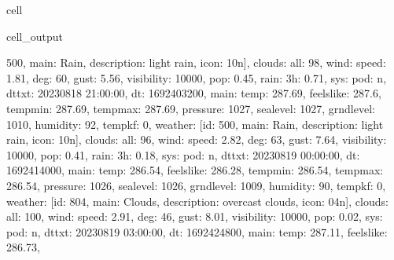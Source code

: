 \documentclass[letterpaper,10pt,english]{jupyterBook}
\begin{document}
\begin{sphinxuseclass}{cell}
\begin{sphinxVerbatimOutput}
\begin{sphinxuseclass}{cell_output}
\begin{sphinxVerbatim}[commandchars=\\\{\}]
500, \PYGZsq{}main\PYGZsq{}: \PYGZsq{}Rain\PYGZsq{}, \PYGZsq{}description\PYGZsq{}: \PYGZsq{}light rain\PYGZsq{}, \PYGZsq{}icon\PYGZsq{}: \PYGZsq{}10n\PYGZsq{}\PYGZcb{}], \PYGZsq{}clouds\PYGZsq{}: \PYGZob{}\PYGZsq{}all\PYGZsq{}: 98\PYGZcb{}, \PYGZsq{}wind\PYGZsq{}: \PYGZob{}\PYGZsq{}speed\PYGZsq{}: 1.81, \PYGZsq{}deg\PYGZsq{}: 60, \PYGZsq{}gust\PYGZsq{}: 5.56\PYGZcb{}, \PYGZsq{}visibility\PYGZsq{}: 10000, \PYGZsq{}pop\PYGZsq{}: 0.45, \PYGZsq{}rain\PYGZsq{}: \PYGZob{}\PYGZsq{}3h\PYGZsq{}: 0.71\PYGZcb{}, \PYGZsq{}sys\PYGZsq{}: \PYGZob{}\PYGZsq{}pod\PYGZsq{}: \PYGZsq{}n\PYGZsq{}\PYGZcb{}, \PYGZsq{}dt\PYGZus{}txt\PYGZsq{}: \PYGZsq{}2023\PYGZhy{}08\PYGZhy{}18 21:00:00\PYGZsq{}\PYGZcb{}, \PYGZob{}\PYGZsq{}dt\PYGZsq{}: 1692403200, \PYGZsq{}main\PYGZsq{}: \PYGZob{}\PYGZsq{}temp\PYGZsq{}: 287.69, \PYGZsq{}feels\PYGZus{}like\PYGZsq{}: 287.6, \PYGZsq{}temp\PYGZus{}min\PYGZsq{}: 287.69, \PYGZsq{}temp\PYGZus{}max\PYGZsq{}: 287.69, \PYGZsq{}pressure\PYGZsq{}: 1027, \PYGZsq{}sea\PYGZus{}level\PYGZsq{}: 1027, \PYGZsq{}grnd\PYGZus{}level\PYGZsq{}: 1010, \PYGZsq{}humidity\PYGZsq{}: 92, \PYGZsq{}temp\PYGZus{}kf\PYGZsq{}: 0\PYGZcb{}, \PYGZsq{}weather\PYGZsq{}: [\PYGZob{}\PYGZsq{}id\PYGZsq{}: 500, \PYGZsq{}main\PYGZsq{}: \PYGZsq{}Rain\PYGZsq{}, \PYGZsq{}description\PYGZsq{}: \PYGZsq{}light rain\PYGZsq{}, \PYGZsq{}icon\PYGZsq{}: \PYGZsq{}10n\PYGZsq{}\PYGZcb{}], \PYGZsq{}clouds\PYGZsq{}: \PYGZob{}\PYGZsq{}all\PYGZsq{}: 96\PYGZcb{}, \PYGZsq{}wind\PYGZsq{}: \PYGZob{}\PYGZsq{}speed\PYGZsq{}: 2.82, \PYGZsq{}deg\PYGZsq{}: 63, \PYGZsq{}gust\PYGZsq{}: 7.64\PYGZcb{}, \PYGZsq{}visibility\PYGZsq{}: 10000, \PYGZsq{}pop\PYGZsq{}: 0.41, \PYGZsq{}rain\PYGZsq{}: \PYGZob{}\PYGZsq{}3h\PYGZsq{}: 0.18\PYGZcb{}, \PYGZsq{}sys\PYGZsq{}: \PYGZob{}\PYGZsq{}pod\PYGZsq{}: \PYGZsq{}n\PYGZsq{}\PYGZcb{}, \PYGZsq{}dt\PYGZus{}txt\PYGZsq{}: \PYGZsq{}2023\PYGZhy{}08\PYGZhy{}19 00:00:00\PYGZsq{}\PYGZcb{}, \PYGZob{}\PYGZsq{}dt\PYGZsq{}: 1692414000, \PYGZsq{}main\PYGZsq{}: \PYGZob{}\PYGZsq{}temp\PYGZsq{}: 286.54, \PYGZsq{}feels\PYGZus{}like\PYGZsq{}: 286.28, \PYGZsq{}temp\PYGZus{}min\PYGZsq{}: 286.54, \PYGZsq{}temp\PYGZus{}max\PYGZsq{}: 286.54, \PYGZsq{}pressure\PYGZsq{}: 1026, \PYGZsq{}sea\PYGZus{}level\PYGZsq{}: 1026, \PYGZsq{}grnd\PYGZus{}level\PYGZsq{}: 1009, \PYGZsq{}humidity\PYGZsq{}: 90, \PYGZsq{}temp\PYGZus{}kf\PYGZsq{}: 0\PYGZcb{}, \PYGZsq{}weather\PYGZsq{}: [\PYGZob{}\PYGZsq{}id\PYGZsq{}: 804, \PYGZsq{}main\PYGZsq{}: \PYGZsq{}Clouds\PYGZsq{}, \PYGZsq{}description\PYGZsq{}: \PYGZsq{}overcast clouds\PYGZsq{}, \PYGZsq{}icon\PYGZsq{}: \PYGZsq{}04n\PYGZsq{}\PYGZcb{}], \PYGZsq{}clouds\PYGZsq{}: \PYGZob{}\PYGZsq{}all\PYGZsq{}: 100\PYGZcb{}, \PYGZsq{}wind\PYGZsq{}: \PYGZob{}\PYGZsq{}speed\PYGZsq{}: 2.91, \PYGZsq{}deg\PYGZsq{}: 46, \PYGZsq{}gust\PYGZsq{}: 8.01\PYGZcb{}, \PYGZsq{}visibility\PYGZsq{}: 10000, \PYGZsq{}pop\PYGZsq{}: 0.02, \PYGZsq{}sys\PYGZsq{}: \PYGZob{}\PYGZsq{}pod\PYGZsq{}: \PYGZsq{}n\PYGZsq{}\PYGZcb{}, \PYGZsq{}dt\PYGZus{}txt\PYGZsq{}: \PYGZsq{}2023\PYGZhy{}08\PYGZhy{}19 03:00:00\PYGZsq{}\PYGZcb{}, \PYGZob{}\PYGZsq{}dt\PYGZsq{}: 1692424800, \PYGZsq{}main\PYGZsq{}: \PYGZob{}\PYGZsq{}temp\PYGZsq{}: 287.11, \PYGZsq{}feels\PYGZus{}like\PYGZsq{}: 286.73, 
\end{sphinxVerbatim}
\end{sphinxuseclass}
\end{sphinxVerbatimOutput}
\end{sphinxuseclass}
\end{document}
